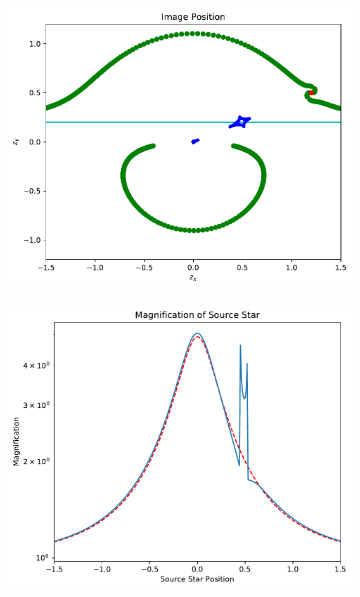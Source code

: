 \documentclass{article}
\begin{document}
\begin{figure}[h]
\centering
\begin{subfigure}{.5\textwidth}
  \begin{minipage}{0.1\textwidth}
    \caption{} \label{fig:Image_1_2_0_5j}
  \end{minipage}\hfill
\begin{minipage}[c]{0.85\textwidth}
    \includegraphics[width=7 cm]{Image_and_Caustic_Curves_x_1_2_0_5j.pdf}
  \end{minipage}\hfill
\end{subfigure}%
\begin{subfigure}{.5\textwidth}
  \begin{minipage}{0.1\textwidth}
    \caption{} \label{fig:Magnification_1_2_0_5j}
  \end{minipage}\hfill
\begin{minipage}[c]{0.85\textwidth}
    \includegraphics[width=7 cm]{Magnification_x_1_2_0_5j.pdf}
  \end{minipage}\hfill
\end{subfigure} \\
\begin{subfigure}{.5\textwidth}
  \begin{minipage}{0.1\textwidth}
    \caption{} \label{fig:Image_1_2_n0_5j}
  \end{minipage}\hfill
\begin{minipage}[c]{0.85\textwidth}

\end{minipage}
\end{subfigure}
\end{figure}
\end{document}
